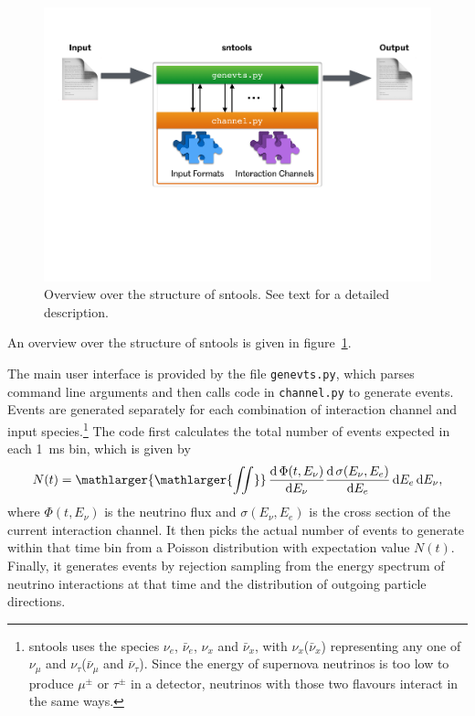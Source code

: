 \documentclass[11pt, oneside]{article}
\renewcommand{\d}{\mathrm{d}}
\newcommand{\tdiff}[3][\empty]{\ifx\empty#1
		\frac{\d\,#2}{\d #3}
	\else
		\frac{\d^{#1}\,#2}{\d #3^{#1}}
	\fi} %
\newcommand{\nue}{\ensuremath{\nu_e}\xspace}
\newcommand{\numu}{\ensuremath{\nu_\mu}\xspace}
\newcommand{\nutau}{\ensuremath{\nu_\tau}\xspace}
\newcommand{\nux}{\ensuremath{\nu_x}\xspace}
\newcommand{\nuebar}{\ensuremath{\bar{\nu}_e}\xspace}
\newcommand{\numubar}{\ensuremath{\bar{\nu}_\mu}\xspace}
\newcommand{\nutaubar}{\ensuremath{\bar{\nu}_\tau}\xspace}
\newcommand{\nuxbar}{\ensuremath{\bar{\nu}_x}\xspace}
\begin{document}
\begin{figure}[htbp]
	\centering
	\includegraphics[scale=0.52]{sntools-overview.pdf}
	\caption[Overview over the structure of sntools]{Overview over the structure of sntools. See text for a detailed description.}
	\label{fig-sim-sntools-overview}
\end{figure}

An overview over the structure of sntools is given in figure~\ref{fig-sim-sntools-overview}.

The main user interface is provided by the file \texttt{genevts.py}, which parses command line arguments and then calls code in \texttt{channel.py} to generate events.
Events are generated separately for each combination of interaction channel and input species.\footnote{sntools uses the species \nue, \nuebar, \nux and \nuxbar, with \nux (\nuxbar) representing any one of \numu and \nutau (\numubar and \nutaubar). Since the energy of supernova neutrinos is too low to produce $\mu^\pm$ or $\tau^\pm$ in a detector, neutrinos with those two flavours interact in the same ways.}
The code first calculates the total number of events expected in each \SI{1}{ms} bin, which is given by
\begin{equation}
N(t) = \mathop{\mathlarger{\mathlarger{\iint}}} \tdiff{\Phi (t, E_\nu)}{E_\nu} \tdiff{\sigma (E_\nu, E_e)}{E_e}\, \d E_e\,\d E_\nu,
\end{equation}
where $\Phi (t, E_\nu)$ is the neutrino flux and $\sigma (E_\nu, E_e)$ is the cross section of the current interaction channel.
It then picks the actual number of events to generate within that time bin from a Poisson distribution with expectation value $N(t)$.
Finally, it generates events by rejection sampling from the energy spectrum of neutrino interactions at that time and the distribution of outgoing particle directions.
\end{document}
